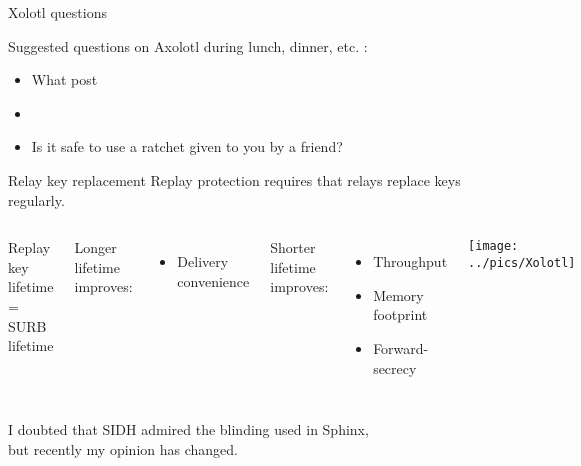 





\begin{frame}{Xolotl questions}

Suggested questions on Axolotl during lunch, dinner, etc. : 

\medskip
\begin{itemize}
\item What post \\ \medskip
\item  \\ \medskip
\item Is it safe to use a ratchet given to you by a friend?  \\
\end{itemize}

\end{frame}









\begin{frame}[t]{Relay key replacement }
Replay protection requires that relays replace keys regularly. 
\begin{columns}[T]
{\hfil Replay key lifetime = SURB lifetime \hfil}

\medskip
Longer lifetime improves:
\begin{itemize}
\item Delivery convenience
\end{itemize}

\smallskip
Shorter lifetime improves:
\begin{itemize}
\item Throughput 
\item Memory footprint
\item Forward-secrecy
\end{itemize}

\texttt{[image: ../pics/Xolotl]}
\end{columns}
\end{frame}







\pause\medskip
I doubted that SIDH admired the blinding used in Sphinx, \\
\hspace*{3pt} but recently my opinion has changed. \\

